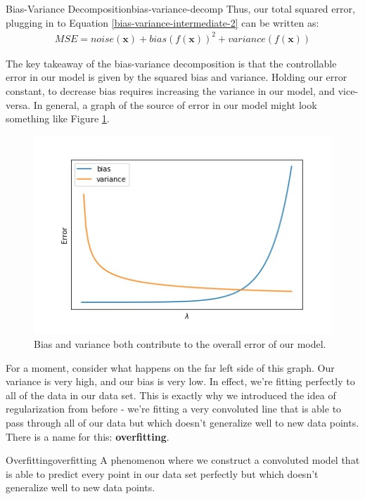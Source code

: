 \begin{derivation}{Bias-Variance Decomposition}{bias-variance-decomp}
    Thus, our total squared error, plugging in to Equation \ref{bias-variance-intermediate-2} can be written as:
    \begin{align*}
        \boxed{\textit{MSE} = \textit{noise}(\textbf{x}) + \textit{bias}(f(\textbf{x}))^{2} + \textit{variance}(f(\textbf{x}))}
    \end{align*}
\end{derivation}

\newpage
The key takeaway of the bias-variance decomposition is that the controllable error in our model is given by the squared bias and variance. Holding our error constant, to decrease bias requires increasing the variance in our model, and vice-versa. In general, a graph of the source of error in our model might look something like Figure \ref{fig:bias-vs-variance}.

\begin{figure}
    \centering
    \includegraphics[width=0.5\paperwidth]{../LinearRegression/fig/biasvariance_GEN.jpg}
    \caption{Bias and variance both contribute to the overall error of our model.}
    \label{fig:bias-vs-variance}
\end{figure}

For a moment, consider what happens on the far left side of this graph. Our variance is very high, and our bias is very low. In effect, we're fitting perfectly to all of the data in our data set. This is exactly why we introduced the idea of regularization from before - we're fitting a very convoluted line that is able to pass through all of our data but which doesn't generalize well to new data points. There is a name for this: \textbf{overfitting}.

\begin{definition}{Overfitting}{overfitting}
    A phenomenon where we construct a convoluted model that is able to predict every point in our data set perfectly but which doesn't generalize well to new data points.
\end{definition}

